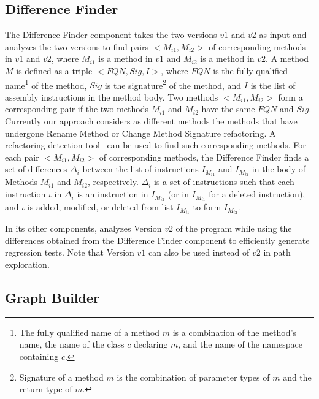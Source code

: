 \subsection{Difference Finder}
The Difference Finder component takes the two versions $v1$ and $v2$ as input and analyzes the two versions to find pairs $<M_{i1}, M_{i2}>$ of corresponding methods in $v1$ and $v2$, where $M_{i1}$ is a method in $v1$ and $M_{i2}$ is a method in $v2$. A method $M$ is defined as a triple $<FQN, Sig, I>$, where $FQN$ is the fully qualified name\footnote{\scriptsize{The fully qualified name of a method $m$ is a combination of the method's name, the name of the class $c$ declaring $m$, and the name of the namespace containing $c$.}} of the method, $Sig$ is the signature\footnote{\scriptsize{Signature of a method $m$ is the combination of parameter types of $m$ and the return type of $m$.}} of the method, and $I$ is the list of assembly instructions in the method body. Two methods $<M_{i1}, M_{i2}>$ form a  corresponding pair if the two methods $M_{i1}$ and $M_{i2}$ have the same $FQN$ and $Sig$. Currently our approach considers as different methods the methods that have undergone Rename Method or Change Method Signature refactoring. A refactoring detection tool~\cite{Dig'06:ECOOP} can be used to find such corresponding methods. For each pair $<M_{i1}, M_{i2}>$ of corresponding methods, the Difference Finder finds a set of  differences $\Delta_i$ between the list of instructions $I_{M_{i1}}$ and $I_{M_{i2}}$ in the body of Methods $M_{i1}$ and $M_{i2}$, respectively. $\Delta_i$ is a set of instructions such that each instruction $\iota$ in $\Delta_i$ is an instruction in $I_{M_{i2}}$ (or in $I_{M_{i1}}$ for a deleted instruction), and $\iota$ is added, modified, or deleted from list $I_{M_{i1}}$ to form $I_{M_{i2}}$.

In its other components,  analyzes Version $v2$ of the program while using the differences obtained from the Difference Finder component to efficiently generate regression tests. Note that Version $v1$ can also be used instead of $v2$ in path exploration.

\subsection{Graph Builder}
   
